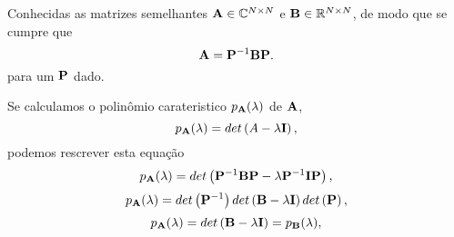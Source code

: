 \begin{myproofT}\label{proof:theo:similhante1}
Conhecidas as matrizes semelhantes $\MATRIX{A} \in \mathbb{C}^{N \times N}$ e $\MATRIX{B} \in \mathbb{R}^{N \times N}$,
de modo que se cumpre que 
\begin{equation}
\MATRIX{A} = \MATRIX{P}^{-1} \MATRIX{B} \MATRIX{P}.
\end{equation}
para um $\MATRIX{P}$ dado.

Se calculamos o polinômio carateristico $p_{\MATRIX{A}}(\lambda)$ de $\MATRIX{A}$,
\begin{equation}
p_{\MATRIX{A}}(\lambda)=det\left(A-\lambda \MATRIX{I}\right),
\end{equation}
podemos rescrever esta equação
\begin{equation}
p_{\MATRIX{A}}(\lambda)=det\left(\MATRIX{P}^{-1} \MATRIX{B} \MATRIX{P}-\lambda \MATRIX{P}^{-1} \MATRIX{I} \MATRIX{P} \right),
\end{equation}
\begin{equation}
p_{\MATRIX{A}}(\lambda)=det\left( \MATRIX{P}^{-1}\right)det\left( \MATRIX{B} -\lambda \MATRIX{I} \right)det\left( \MATRIX{P}\right),
\end{equation}
\begin{equation}
p_{\MATRIX{A}}(\lambda)=det\left( \MATRIX{B} -\lambda \MATRIX{I} \right) = p_{\MATRIX{B}}(\lambda),
\end{equation}
\end{myproofT}
